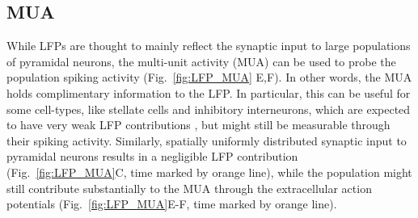 \documentclass[preprint,11pt,authoryear]{elsarticle}
\newcommand{\hlj}[2][OliveGreen]{ {\sethlcolor{#1} \hl{#2}} }
\newcommand{\hlR}[2][red]{ {\sethlcolor{#1} \hl{#2}} }
\newcommand{\gen}[1]{\color{white}{\hlR{GTE: #1 }}\color{black}}
\newcommand{\gex}[1]{{\color{red}#1}}
\newcommand{\tvnnote}[1]{\color{white}{\hlj{TVN: #1 }}\color{black}}
\newcommand{\tvntxt}[1]{{\color{OliveGreen}#1}}
\begin{document}




\subsection{MUA}
While LFPs are thought to mainly reflect the synaptic input to large populations of pyramidal neurons, the multi-unit activity (MUA) can be used to probe the population spiking activity \citep{Einevoll2007,Pettersen2008} (Fig.~\ref{fig:LFP_MUA} E,F). In other words, the MUA holds complimentary information to the LFP. In particular, this can be useful for some cell-types, like stellate cells and \gex{inhibitory} interneurons, which are expected to have very weak LFP contributions \citep{Linden2011}, but might still be measurable through their spiking activity. 
Similarly, spatially uniformly distributed synaptic input to pyramidal neurons results in a negligible LFP contribution (Fig.~\ref{fig:LFP_MUA}C, time marked by orange line), while the population might still contribute substantially to the MUA through the extracellular action potentials (Fig.~\ref{fig:LFP_MUA}E-F, time marked by orange line). 
\end{document}
